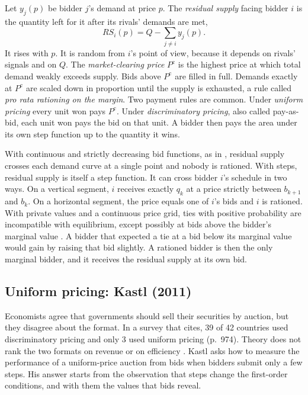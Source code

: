 Let $y_j(p)$ be bidder $j$'s demand at price $p$. The \emph{residual supply} facing bidder $i$ is the
quantity left for it after its rivals' demands are met,
\begin{equation}\label{eq:15-div-rs}
RS_i(p)=Q-\sum_{j\neq i}y_j(p).
\end{equation}
It rises with $p$. It is random from $i$'s point of view, because it depends on rivals' signals and on $Q$.
The \emph{market-clearing price} $P^{\mathrm c}$ is the highest price at which total demand weakly exceeds
supply. Bids above $P^{\mathrm c}$ are filled in full. Demands exactly at $P^{\mathrm c}$ are scaled down in
proportion until the supply is exhausted, a rule called \emph{pro rata rationing on the margin}. Two payment
rules are common. Under \emph{uniform pricing} every unit won pays $P^{\mathrm c}$. Under
\emph{discriminatory pricing}, also called pay-as-bid, each unit won pays the bid on that unit. A bidder then
pays the area under its own step function up to the quantity it wins.

With continuous and strictly decreasing bid functions, as in \citet{Wilson1979}, residual supply crosses each
demand curve at a single point and nobody is rationed. With steps, residual supply is itself a step function.
It can cross bidder $i$'s schedule in two ways. On a vertical segment, $i$ receives exactly $q_k$ at a price
strictly between $b_{k+1}$ and $b_k$. On a horizontal segment, the price equals one of $i$'s bids and $i$ is
rationed. With private values and a continuous price grid, ties with positive probability are incompatible
with equilibrium, except possibly at bids above the bidder's marginal value \citep[p.~984 and
Appendix~B]{Kastl2011}. A bidder that expected a tie at a bid below its marginal value would gain by raising
that bid slightly. A rationed bidder is then the only marginal bidder, and it
receives the residual supply at its own bid.

\subsection{Uniform pricing: Kastl (2011)}\label{sec:15-kastl}

 Economists agree that governments should sell their securities by auction, but they
disagree about the format. In a survey that \citet{Kastl2011} cites, 39 of 42 countries used discriminatory
pricing and only 3 used uniform pricing (p.~974). Theory does not rank the two formats on revenue or on
efficiency \citep[Section~10]{AtheyHaile2007}. Kastl asks how to measure the performance of a uniform-price
auction from bids when bidders submit only a few steps. His answer starts from the observation that steps
change the first-order conditions, and with them the values that bids reveal.

